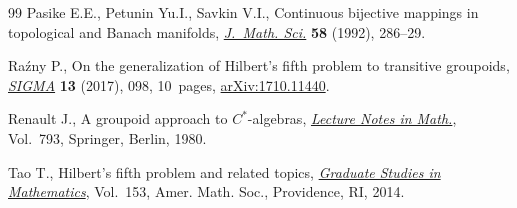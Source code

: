 \documentclass[11pt]{article}
\begin{document}
\begin{thebibliography}{99}
Pasike E.E., Petunin Yu.I., Savkin V.I., Continuous bijective mappings in
 topological and {B}anach manifolds, \href{https://doi.org/10.1007/BF01098343}{\textit{J.~Math. Sci.}} \textbf{58}
 (1992), 286--29.

Ra\'zny P., On the generalization of {H}ilbert's fifth problem to transitive
 groupoids, \href{https://doi.org/10.3842/SIGMA.2017.098}{\textit{SIGMA}} \textbf{13} (2017), 098, 10~pages,
 \href{https://arxiv.org/abs/1710.11440}{arXiv:1710.11440}.

Renault J., A groupoid approach to {$C^{\ast} $}-algebras, \href{https://doi.org/10.1007/BFb0091072}{\textit{Lecture
 Notes in Math.}}, Vol.~793, Springer, Berlin, 1980.

Tao T., Hilbert's fifth problem and related topics, \href{https://doi.org/10.1090/gsm/153}{\textit{Graduate Studies in
 Mathematics}}, Vol.~153, Amer. Math. Soc., Providence, RI, 2014.

\end{thebibliography}
\end{document}
